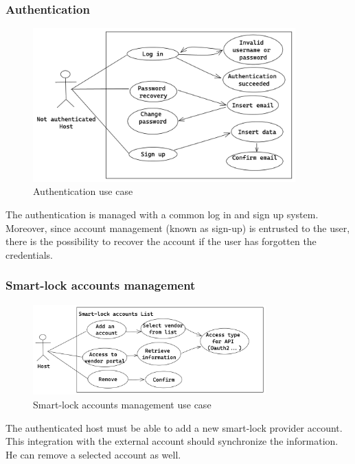 \subsubsection{Authentication}
\begin{figure}[H]
    \centering
    \includegraphics[width=0.9\textwidth]{figures/authentication.excalidraw.png}
    \caption{Authentication use case}
    \label{fig:authenticationusecase}
\end{figure}
The authentication is managed with a common log in and sign up system. Moreover, since account management (known as sign-up) is entrusted to the user, there is the possibility to recover the account if the user has forgotten the credentials. 

\subsubsection{Smart-lock accounts management}
\begin{figure}[H]
    \centering
    \includegraphics[width=0.8\textwidth]{figures/accounts.excalidraw.png}
    \caption{Smart-lock accounts management use case}
    \label{fig:accountsusecase}
\end{figure}
The authenticated host must be able to add a new smart-lock provider account. This integration with the external account should synchronize the information. He can remove a selected account as well.
